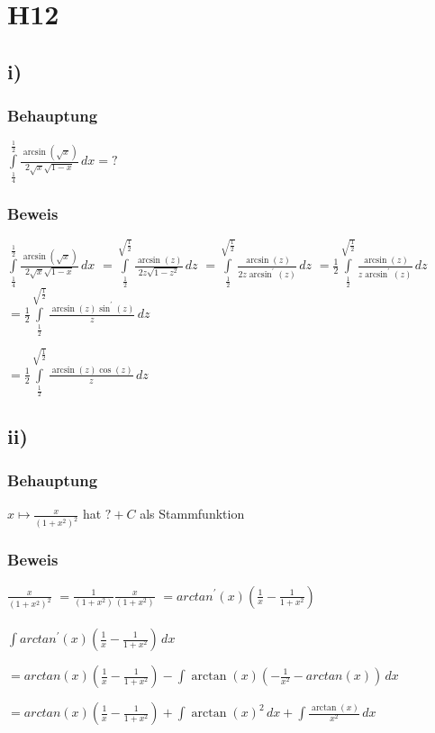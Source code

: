 \section*{H12}

\subsection*{i)}

\subsubsection*{Behauptung}

$\int\limits^{\frac{1}{2}}_{\frac{1}{4}} \frac{\arcsin(\sqrt{x})}{2\sqrt{x}\sqrt{1-x}}\,dx = ?$

\subsubsection*{Beweis}

$\int\limits^{\frac{1}{2}}_{\frac{1}{4}} \frac{\arcsin(\sqrt{x})}{2\sqrt{x}\sqrt{1-x}}\,dx$
$ = \int\limits^{\sqrt{\frac{1}{2}}}_{\frac{1}{2}} \frac{\arcsin(z)}{2z\sqrt{1-z^{2}}}\,dz$
$ = \int\limits^{\sqrt{\frac{1}{2}}}_{\frac{1}{2}} \frac{\arcsin(z)}{2z\arcsin^{\prime}(z)}\,dz$
$ = \frac{1}{2} \int\limits^{\sqrt{\frac{1}{2}}}_{\frac{1}{2}} \frac{\arcsin(z)}{z\arcsin^{\prime}(z)}\,dz$
$ = \frac{1}{2} \int\limits^{\sqrt{\frac{1}{2}}}_{\frac{1}{2}} 
	\frac{\arcsin(z)\sin^{\prime}(z)}{z}\,dz$
	
$ = \frac{1}{2} \int\limits^{\sqrt{\frac{1}{2}}}_{\frac{1}{2}} 
	\frac{\arcsin(z)\cos(z)}{z}\,dz$


\subsection*{ii)}

\subsubsection*{Behauptung}

$x \mapsto \frac{x}{(1+x^{2})^2}$ hat $ ? + C$ als Stammfunktion

\subsubsection*{Beweis}

$   \frac{x}{(1+x^{2})^2} $
$ = \frac{1}{(1+x^{2})}\frac{x}{(1+x^{2})}$
$ = arctan^{\prime}(x)(\frac{1}{x}-\frac{1}{1+x^{2}})$

\paragraph*{}

$\int arctan^{\prime}(x)(\frac{1}{x}-\frac{1}{1+x^{2}}) \,dx$

$ = arctan(x)(\frac{1}{x}-\frac{1}{1+x^{2}}) - \int \arctan(x) (-\frac{1}{x^{2}}-arctan(x))\,dx $


$ = arctan(x)(\frac{1}{x}-\frac{1}{1+x^{2}}) 
+ \int \arctan(x)^{2}\,dx 
+ \int\frac{\arctan(x)}{x^{2}}\,dx $

